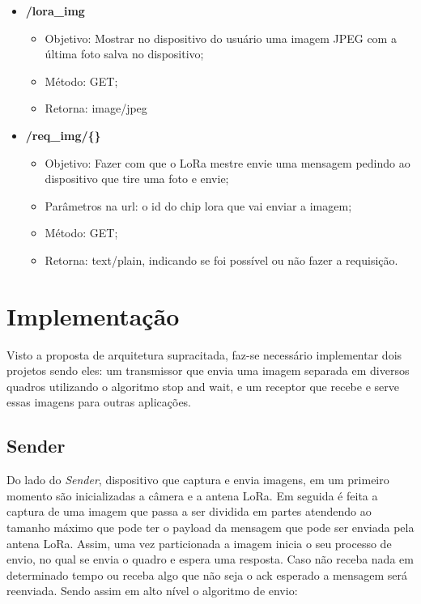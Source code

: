 \documentclass[
article,			%
12pt,				%
oneside,			%
a4paper,			%
english,			%
brazil,				%
sumario=tradicional
]{abntex2}
\begin{document}
\begin{itemize}
    \item\textbf{/lora\_img}
        \begin{itemize}
            \item Objetivo: Mostrar no dispositivo do usuário uma imagem JPEG com a última foto salva no dispositivo;
            \item Método: GET;
            \item Retorna: image/jpeg
        \end{itemize}
    \item\textbf{/req\_img/\{\}}
        \begin{itemize}
            \item Objetivo: Fazer com que o LoRa mestre envie uma mensagem pedindo ao dispositivo que tire uma foto e envie;
            \item Parâmetros na url: o id do chip lora que vai enviar a imagem;
            \item Método: GET;
            \item Retorna: text/plain, indicando se foi possível ou não fazer a requisição.
        \end{itemize}
\end{itemize}

\cleardoublepage

\section{Implementação}\label{Implementação}

Visto a proposta de arquitetura supracitada, faz-se necessário implementar dois projetos sendo eles: um transmissor que envia uma imagem separada em diversos quadros utilizando o algoritmo stop and wait, e um receptor que recebe e serve essas imagens para outras aplicações.

\subsection{Sender}\label{Sender}
Do lado do \textit{Sender}, dispositivo que captura e envia imagens, em um primeiro momento são inicializadas a câmera e a antena LoRa. Em seguida é feita a captura de uma imagem que passa a ser dividida em partes atendendo ao tamanho máximo que pode ter o payload da mensagem que pode ser enviada pela antena LoRa. Assim, uma vez particionada a imagem inicia o seu processo de envio, no qual se envia o quadro e espera uma resposta. Caso não receba nada em determinado tempo ou receba algo que não seja o ack esperado a mensagem será reenviada. Sendo assim em alto nível o algoritmo de envio:
\end{document}
